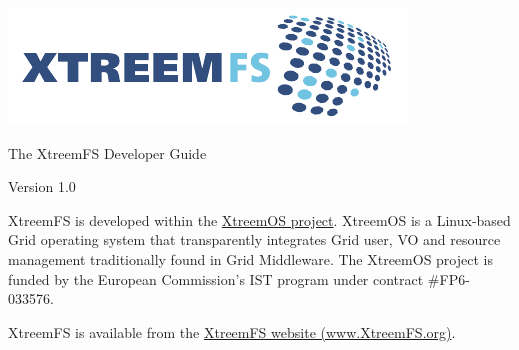 \documentclass[twoside,a4paper,12pt]{book}
\begin{document}
\begin{titlepage}
\begin{flushright}
 \includegraphics{images/final_logo.pdf}
\end{flushright}

\vspace{3cm}

\begin{flushleft}
\sffamily \begin{LARGE}The XtreemFS Developer Guide\end{LARGE}

Version 1.0
\end{flushleft}


\end{titlepage}

XtreemFS is developed within the \href{http://www.xtreemos.eu}{XtreemOS project}. XtreemOS is a Linux-based Grid operating system that transparently integrates Grid user, VO and resource management traditionally found in Grid Middleware. The XtreemOS project is funded by the European Commission's IST program under contract \#FP6-033576.

XtreemFS is available from the \href{http://www.XtreemFS.org}{XtreemFS website (www.XtreemFS.org)}.
\end{document}
